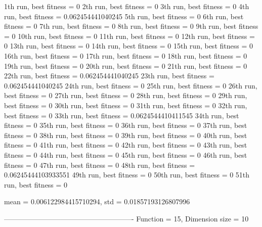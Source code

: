 1th run, best fitness = 0
2th run, best fitness = 0
3th run, best fitness = 0
4th run, best fitness = 0.062454441040245
5th run, best fitness = 0
6th run, best fitness = 0
7th run, best fitness = 0
8th run, best fitness = 0
9th run, best fitness = 0
10th run, best fitness = 0
11th run, best fitness = 0
12th run, best fitness = 0
13th run, best fitness = 0
14th run, best fitness = 0
15th run, best fitness = 0
16th run, best fitness = 0
17th run, best fitness = 0
18th run, best fitness = 0
19th run, best fitness = 0
20th run, best fitness = 0
21th run, best fitness = 0
22th run, best fitness = 0.062454441040245
23th run, best fitness = 0.062454441040245
24th run, best fitness = 0
25th run, best fitness = 0
26th run, best fitness = 0
27th run, best fitness = 0
28th run, best fitness = 0
29th run, best fitness = 0
30th run, best fitness = 0
31th run, best fitness = 0
32th run, best fitness = 0
33th run, best fitness = 0.0624544410411545
34th run, best fitness = 0
35th run, best fitness = 0
36th run, best fitness = 0
37th run, best fitness = 0
38th run, best fitness = 0
39th run, best fitness = 0
40th run, best fitness = 0
41th run, best fitness = 0
42th run, best fitness = 0
43th run, best fitness = 0
44th run, best fitness = 0
45th run, best fitness = 0
46th run, best fitness = 0
47th run, best fitness = 0
48th run, best fitness = 0.06245444103933551
49th run, best fitness = 0
50th run, best fitness = 0
51th run, best fitness = 0

mean = 0.006122984415710294, std = 0.01857193126807996

-------------------------------------------------------
Function = 15, Dimension size = 10

